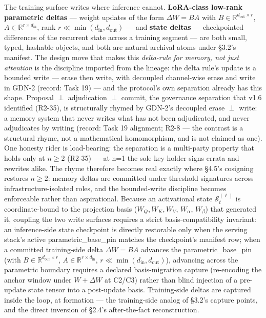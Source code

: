 \documentclass[11pt]{article}
\begin{document}
The training surface writes where inference cannot. \textbf{LoRA-class low-rank parametric deltas} --- weight updates of the form \(\Delta W = BA\) with \(B \in \mathbb{R}^{d_{\text{out}}\times r}\), \(A \in \mathbb{R}^{r\times d_{\text{in}}}\), rank \(r \ll \min(d_{\text{in}}, d_{\text{out}})\) --- and \textbf{state deltas} --- checkpointed differences of the recurrent state across a training segment --- are both small, typed, hashable objects, and both are natural archival atoms under \S{}3.2's manifest. The design move that makes this \emph{delta-rule for memory, not just attention} is the discipline imported from the lineage: the delta rule's update is a bounded write --- erase then write, with decoupled channel-wise erase and write in GDN-2 (record: Task 19) --- and the protocol's own separation already has this shape. Proposal \(\perp\) adjudication \(\perp\) commit, the governance separation that v1.6 identified (R2-35), is structurally rhymed by GDN-2's decoupled erase \(\perp\) write: a memory system that never writes what has not been adjudicated, and never adjudicates by writing (record: Task 19 alignment; R2-8 --- the contrast is a structural rhyme, not a mathematical homomorphism, and is not claimed as one). One honesty rider is load-bearing: the separation is a multi-party property that holds only at \(n\geq 2\) (R2-35) --- at n=1 the sole key-holder signs errata and rewrites alike. The rhyme therefore becomes real exactly where \S{}4.5's cosigning restores \(n\geq 2\): memory deltas are committed under threshold signatures across infrastructure-isolated roles, and the bounded-write discipline becomes enforceable rather than aspirational. Because an activational state \(\mathcal{S}_t^{(\ell)}\) is coordinate-bound to the projection basis (\(W_Q, W_K, W_V\), \(W_{\alpha}\), \(W_{\beta}\)) that generated it, coupling the two write surfaces requires a strict basis-compatibility invariant: an inference-side state checkpoint is directly restorable only when the serving stack's active parametric\_base\_pin matches the checkpoint's manifest row; when a committed training-side delta \(\Delta W = BA\) advances the parametric\_base\_pin (with \(B \in \mathbb{R}^{d_{\text{out}}\times r}\), \(A \in \mathbb{R}^{r\times d_{\text{in}}}\), \(r \ll \min(d_{\text{in}}, d_{\text{out}})\)), advancing across the parametric boundary requires a declared basis-migration capture (re-encoding the anchor window under \(W + \Delta W\) at C2/C3) rather than blind injection of a pre-update state tensor into a post-update basis. Training-side deltas are captured inside the loop, at formation --- the training-side analog of \S{}3.2's capture points, and the direct inversion of \S{}2.4's after-the-fact reconstruction.
\end{document}
